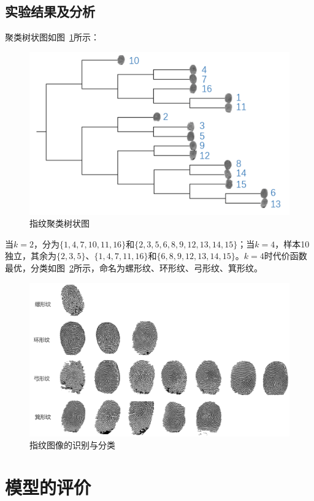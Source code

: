 \documentclass{whutmod}
\begin{document}
        \subsection{实验结果及分析}
            聚类树状图如图~\ref{bgbgbg}所示：

            \begin{figure}[H]
                \centering
                \includegraphics[width=.8\textwidth]{figures/tree.png}
                \caption{指纹聚类树状图}\label{bgbgbg}
            \end{figure}

            当$k=2$，分为$\{1,4,7,10,11,16\}$和$\{2,3,5,6,8,9,12,13,14,15\}$；当$k=4$，样本10独立，其余为$\{2,3,5\}$、$\{1,4,7,11,16\}$和$\{6,8,9,12,13,14,15\}$。$k=4$时代价函数最优，分类如图~\ref{bgssssbgbg}所示，命名为螺形纹、环形纹、弓形纹、箕形纹。

            \begin{figure}[H]
                \centering
                \includegraphics[width=.8\textwidth]{figures/gg.png}
                \caption{指纹图像的识别与分类}\label{bgssssbgbg}
            \end{figure}

    \section{模型的评价}
\end{document}
